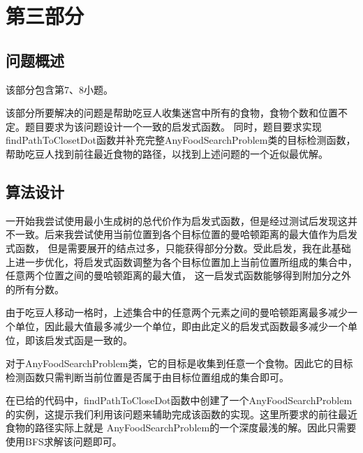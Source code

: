 \chapter{第三部分}
\section{问题概述}
%
%
该部分包含第7、8小题。

该部分所要解决的问题是帮助吃豆人收集迷宫中所有的食物，食物个数和位置不定。题目要求为该问题设计一个一致的启发式函数。
同时，题目要求实现findPathToClosetDot函数并补充完整AnyFoodSearchProblem类的目标检测函数，帮助吃豆人找到前往最近食物的路径，以找到上述问题的一个近似最优解。
%
%

%
%

\section{算法设计}
%
%
一开始我尝试使用最小生成树的总代价作为启发式函数，但是经过测试后发现这并不一致。后来我尝试使用当前位置到各个目标位置的曼哈顿距离的最大值作为启发式函数，
但是需要展开的结点过多，只能获得部分分数。受此启发，我在此基础上进一步优化，将启发式函数调整为各个目标位置加上当前位置所组成的集合中，任意两个位置之间的曼哈顿距离的最大值，
这一启发式函数能够得到附加分之外的所有分数。

由于吃豆人移动一格时，上述集合中的任意两个元素之间的曼哈顿距离最多减少一个单位，因此最大值最多减少一个单位，即由此定义的启发式函数最多减少一个单位，即该启发式函是一致的。

对于AnyFoodSearchProblem类，它的目标是收集到任意一个食物。因此它的目标检测函数只需判断当前位置是否属于由目标位置组成的集合即可。

在已给的代码中，findPathToCloseDot函数中创建了一个AnyFoodSearchProblem的实例，这提示我们利用该问题来辅助完成该函数的实现。这里所要求的前往最近食物的路径实际上就是
AnyFoodSearchProblem的一个深度最浅的解。因此只需要使用BFS求解该问题即可。
